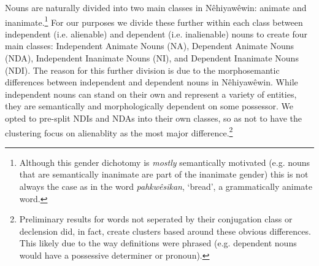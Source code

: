 Nouns are naturally divided into two main classes in Nêhiyawêwin: animate and inanimate.\footnote{Although this gender dichotomy is \textit{mostly} semantically motivated (e.g. nouns that are semantically inanimate are part of the inanimate gender) this is not always the case as in the word \textit{pahkwêsikan}, `bread', a grammatically animate word.} For our purposes we divide these further within each class between independent (i.e. alienable) and dependent (i.e. inalienable) nouns to create four main classes: Independent Animate Nouns (NA), Dependent Animate Nouns (NDA), Independent Inanimate Nouns (NI), and Dependent Inanimate Nouns (NDI). The reason for this further division is due to the morphosemantic differences between independent and dependent nouns in Nêhiyawêwin. While independent nouns can stand on their own and represent a variety of entities, they are semantically and morphologically dependent on some possessor.  We opted to pre-split NDIs and NDAs into their own classes, so as not to have the clustering focus on alienablity as the most major difference.\footnote{Preliminary results for words not seperated by their conjugation class or declension did, in fact, create clusters based around these obvious differences. This likely due to the way definitions were phrased (e.g. dependent nouns would have a possessive determiner or pronoun).}

